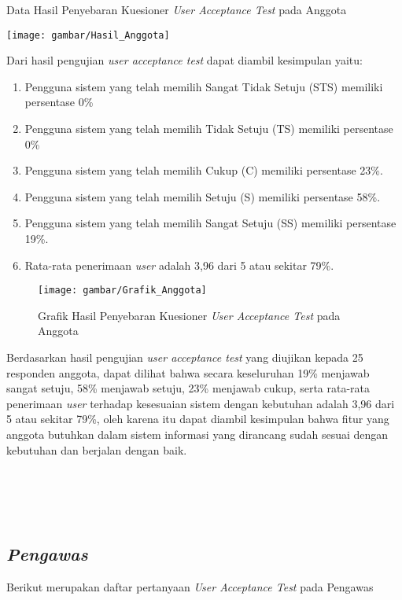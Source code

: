 \begin{table}[H]
	\centering
	\caption{Data Hasil Penyebaran Kuesioner \textit{User Acceptance Test} pada Anggota}
	\texttt{[image: gambar/Hasil\_Anggota]}
\end{table}

Dari hasil pengujian \textit{user acceptance test} dapat diambil kesimpulan yaitu:

\begin{enumerate}
	\item Pengguna sistem yang telah memilih Sangat Tidak Setuju (STS) memiliki persentase 0\%
	\item Pengguna sistem yang telah memilih Tidak Setuju (TS) memiliki persentase 0\%
	\item Pengguna sistem yang telah memilih Cukup (C) memiliki persentase 23\%.
	\item Pengguna sistem yang telah memilih Setuju (S) memiliki persentase 58\%.
	\item Pengguna sistem yang telah memilih Sangat Setuju (SS) memiliki persentase 19\%.
	\item Rata-rata penerimaan \textit{user} adalah 3,96 dari 5 atau sekitar 79\%.
\end{enumerate}

\begin{figure}[H]
	\centering
	\texttt{[image: gambar/Grafik\_Anggota]}
	\caption{Grafik Hasil Penyebaran Kuesioner \textit{User Acceptance Test} pada Anggota}
\end{figure}

Berdasarkan hasil pengujian \textit{user acceptance test} yang diujikan kepada 25 responden anggota, dapat dilihat bahwa secara keseluruhan 19\% menjawab sangat setuju, 58\% menjawab setuju, 23\% menjawab cukup, serta rata-rata penerimaan \textit{user} terhadap kesesuaian sistem dengan kebutuhan adalah 3,96 dari 5 atau sekitar 79\%, oleh karena itu dapat diambil kesimpulan bahwa fitur yang anggota butuhkan dalam sistem informasi yang dirancang sudah sesuai dengan kebutuhan dan berjalan dengan baik. 
\\
\\
\\
\\
\\

\subsection{\textit{Pengawas}}
Berikut merupakan daftar pertanyaan \textit{User Acceptance Test} pada Pengawas

